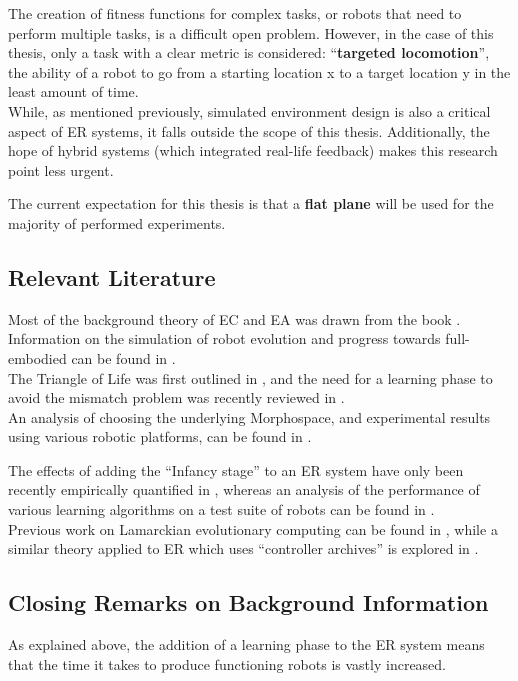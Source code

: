 \documentclass{scrartcl}
\begin{document}
The creation of fitness functions for complex tasks, or robots that need to perform multiple tasks, is a difficult open problem.
However, in the case of this thesis, only a task with a clear metric is considered: ``\textbf{targeted locomotion}'', the ability of a robot to go from a starting location x to a target location y in the least amount of time. \\

While, as mentioned previously, simulated environment design is also a critical aspect of ER systems, it falls outside the scope of this thesis. Additionally, the hope of hybrid systems (which integrated real-life feedback) makes this research point less urgent.

The current expectation for this thesis is that a \textbf{flat plane} will be used for the majority of performed experiments.

\newpage

\subsection{Relevant Literature}
Most of the background theory of EC and EA was drawn from the book \cite{Eiben2015a}. \\

Information on the simulation of robot evolution and progress towards full-embodied can be found in \cite{Faina2021}. \\

The Triangle of Life was first outlined in \cite{Eiben2013}, and the need for a learning phase to avoid the mismatch problem was recently reviewed in \cite{Eiben2020}. \\

An analysis of choosing the underlying Morphospace, and experimental results using various robotic platforms, can be found in \cite{Jelisavcic2017}.

The effects of adding the ``Infancy stage'' to an ER system have only been recently empirically quantified in \cite{Luo2022}, whereas an analysis of the performance of various learning algorithms on a test suite of robots can be found in \cite{Diggelen2022}. \\

Previous work on Lamarckian evolutionary computing can be found in \cite{Jelisavcic2019}, while a similar theory applied to ER which uses ``controller archives'' is explored in \cite{LeGoff2022}.

\subsection{Closing Remarks on Background Information}
As explained above, the addition of a learning phase to the ER system means that the time it takes to produce functioning robots is vastly increased.
\end{document}
